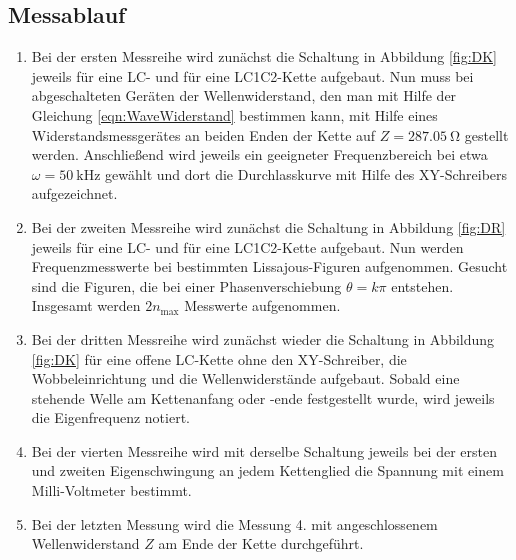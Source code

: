 \subsection{Messablauf}

\begin{enumerate}

\item
Bei der ersten Messreihe wird zunächst die Schaltung in Abbildung
\ref{fig:DK} jeweils für eine LC- und für eine LC1C2-Kette aufgebaut. Nun muss
bei abgeschalteten Geräten der Wellenwiderstand, den man mit Hilfe der
Gleichung \eqref{eqn:WaveWiderstand} bestimmen kann, mit Hilfe eines
Widerstandsmessgerätes
an beiden Enden der Kette auf $Z = \SI{287.05}{\ohm}$ gestellt werden.
Anschließend wird jeweils ein geeigneter Frequenzbereich bei etwa $\omega =
\SI{50}{\kilo\Hz}$ gewählt und dort die Durchlasskurve mit Hilfe des
XY-Schreibers aufgezeichnet.

\item
Bei der zweiten Messreihe wird zunächst die Schaltung in Abbildung
\ref{fig:DR} jeweils für eine LC- und für eine LC1C2-Kette aufgebaut.
Nun werden Frequenzmesswerte bei bestimmten Lissajous-Figuren aufgenommen.
Gesucht sind die Figuren, die bei einer Phasenverschiebung $\theta = k\pi$
entstehen. Insgesamt werden $2 n_\text{max}$ Messwerte aufgenommen.

\item
Bei der dritten Messreihe wird zunächst wieder die Schaltung in Abbildung
\ref{fig:DK} für eine offene LC-Kette ohne den XY-Schreiber, die
Wobbeleinrichtung und die Wellenwiderstände aufgebaut. Sobald eine
stehende Welle am Kettenanfang oder -ende festgestellt wurde, wird jeweils
die Eigenfrequenz notiert.

\item
Bei der vierten Messreihe wird mit derselbe Schaltung jeweils bei der ersten und
zweiten Eigenschwingung an jedem Kettenglied die Spannung mit einem
Milli-Voltmeter bestimmt.

\item
Bei der letzten Messung wird die Messung 4. mit angeschlossenem Wellenwiderstand
$Z$ am Ende der Kette durchgeführt.

\end{enumerate}
